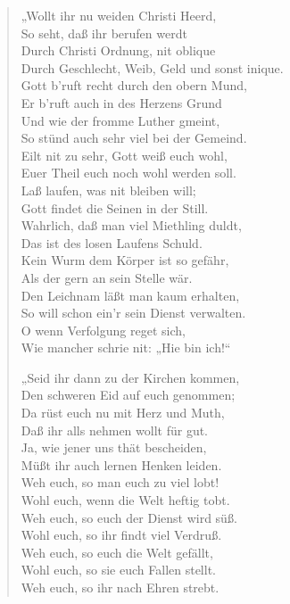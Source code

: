 \begin{verse}
„Wollt ihr nu weiden Christi Heerd,\\
So seht, daß ihr berufen werdt\\
Durch Christi Ordnung, nit oblique\\
Durch Geschlecht, Weib, Geld und sonst inique.\\
Gott b’ruft recht durch den obern Mund,\\
Er b’ruft auch in des Herzens Grund\\
Und wie der fromme Luther gmeint,\\
So stünd auch sehr viel bei der Gemeind.\\
Eilt nit zu sehr, Gott weiß euch wohl,\\
Euer Theil euch noch wohl werden soll.\\
Laß laufen, was nit bleiben will;\\
Gott findet die Seinen in der Still.\\
Wahrlich, daß man viel Miethling duldt,\\
Das ist des losen Laufens Schuld.\\
Kein Wurm dem Körper ist so gefähr,\\
Als der gern an sein Stelle wär.\\
Den Leichnam läßt man kaum erhalten,\\
So will schon ein’r sein Dienst verwalten.\\
O wenn Verfolgung reget sich,\\
Wie mancher schrie nit: „Hie bin ich!“

„Seid ihr dann zu der Kirchen kommen,\\
Den schweren Eid auf euch genommen;\\
Da rüst euch nu mit Herz und Muth,\\
Daß ihr alls nehmen wollt für gut.\\
Ja, wie jener uns thät bescheiden,\\
Müßt ihr auch lernen Henken leiden.\\
Weh euch, so man euch zu viel lobt!\\
Wohl euch, wenn die Welt heftig tobt.\\
Weh euch, so euch der Dienst wird süß.\\
Wohl euch, so ihr findt viel Verdruß.\\
Weh euch, so euch die Welt gefällt,\\
Wohl euch, so sie euch Fallen stellt.\\
Weh euch, so ihr nach Ehren strebt.
\end{verse}

